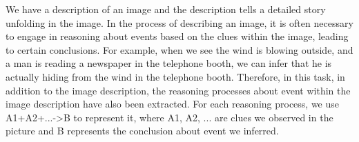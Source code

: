 \begin{figure*}[h]
    \scriptsize
    \begin{tcolorbox}[
      colframe = blue!30!white, 
      colback = blue!2!white,
      colbacktitle = blue!10!white,
      colupper = black, collower = yellow!75!red,
      coltitle = black!90!white,
      ]
    We have a description of an image and the description tells a detailed story unfolding in the image. In the process of describing an image, it is often necessary to engage in reasoning about events based on the clues within the image, leading to certain conclusions. For example, when we see the wind is blowing outside, and a man is reading a newspaper in the telephone booth, we can infer that he is actually hiding from the wind in the telephone booth. Therefore, in this task, in addition to the image description, the reasoning processes about event within the image description have also been extracted. For each reasoning process, we use A1+A2+...->B to represent it, where A1, A2, ... are clues we observed in the picture and B represents the conclusion about event we inferred. \\


\end{tcolorbox}
\end{figure*}
